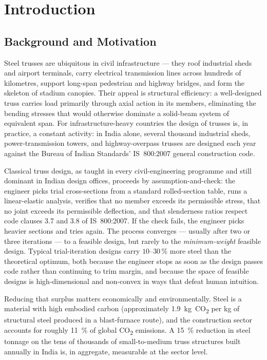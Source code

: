 \chapter{Introduction}
\label{chap:introduction}

\section{Background and Motivation}
\label{sec:intro:motivation}

Steel trusses are ubiquitous in civil infrastructure — they roof
industrial sheds and airport terminals, carry electrical
transmission lines across hundreds of kilometres, support long-span
pedestrian and highway bridges, and form the skeleton of stadium
canopies. Their appeal is structural efficiency: a well-designed
truss carries load primarily through axial action in its members,
eliminating the bending stresses that would otherwise dominate a
solid-beam system of equivalent span. For infrastructure-heavy
countries the design of trusses is, in practice, a constant activity:
in India alone, several thousand industrial sheds, power-transmission
towers, and highway-overpass trusses are designed each year against
the Bureau of Indian Standards' IS~800:2007 general construction
code.

Classical truss design, as taught in every civil-engineering
programme and still dominant in Indian design offices, proceeds by
assumption-and-check: the engineer picks trial cross-sections from a
standard rolled-section table, runs a linear-elastic analysis,
verifies that no member exceeds its permissible stress, that no joint
exceeds its permissible deflection, and that slenderness
ratios respect code clauses 3.7 and 3.8 of IS~800:2007. If the
check fails, the engineer picks heavier sections and tries again.
The process converges — usually after two or three iterations — to a
feasible design, but rarely to the \emph{minimum-weight} feasible
design. Typical trial-iteration designs carry $10$--$30\,\%$ more
steel than the theoretical optimum, both because the engineer stops
as soon as the design passes code rather than continuing to trim
margin, and because the space of feasible designs is high-dimensional
and non-convex in ways that defeat human intuition.

Reducing that surplus matters economically and environmentally.
Steel is a material with high embodied carbon (approximately
\num{1.9}~kg~CO\textsubscript{2} per kg of structural steel produced
in a blast-furnace route), and the construction sector accounts for
roughly \num{11}~\% of global CO\textsubscript{2} emissions. A
\num{15}~\% reduction in steel tonnage on the tens of thousands of
small-to-medium truss structures built annually in India is, in
aggregate, measurable at the sector level.

